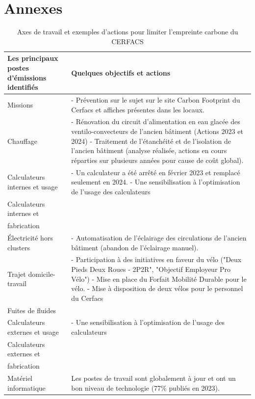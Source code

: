 \section*{Annexes}

\begin{table}[ht]
    \centering
    \begin{tabular}{|p{}|p{}|}
    \hline
    \textbf{Les principaux postes d’émissions identifiés} & \textbf{Quelques objectifs et actions} \\
    \hline
    Missions & 
    - Prévention sur le sujet sur le site Carbon Footprint du Cerfacs et affiches présentes dans les locaux. \\
    \hline
    Chauffage & 
    - Rénovation du circuit d’alimentation en eau glacée des ventilo-convecteurs de l’ancien bâtiment (Actions 2023 et 2024) \newline
    - Traitement de l’étanchéité et de l’isolation de l’ancien bâtiment (analyse réalisée, actions en cours réparties sur plusieurs années pour cause de coût global). \\
    \hline
    Calculateurs internes et usage & 
    - Un calculateur a été arrêté en février 2023 et remplacé seulement en 2024. \newline
    - Une sensibilisation à l’optimisation de l’usage des calculateurs \\
    \hline
    Calculateurs internes et \\fabrication &  \\
    \hline
    Électricité hors clusters & 
    - Automatisation de l’éclairage des circulations de l’ancien bâtiment (abandon de l’éclairage manuel). \\
    \hline
    Trajet domicile-travail & 
    - Participation à des initiatives en faveur du vélo ("Deux Pieds Deux Roues - 2P2R", "Objectif Employeur Pro Vélo") \newline
    - Mise en place du Forfait Mobilité Durable pour le vélo. \newline
    - Mise à disposition de deux vélos pour le personnel du Cerfacs \\
    \hline
    Fuites de fluides &  \\
    \hline
    Calculateurs externes et usage & 
    - Une sensibilisation à l’optimisation de l’usage des calculateurs \\
    \hline
    Calculateurs externes et \\fabrication &  \\
    \hline
    Matériel informatique & 
    Les postes de travail sont globalement à jour et ont un bon niveau de technologie (77\% publiés en 2023). \\
    \hline
    \end{tabular}
    \caption{Axes de travail et exemples d'actions pour limiter l'empreinte carbone du CERFACS}
    \label{tab:Eco_actions}
\end{table}


